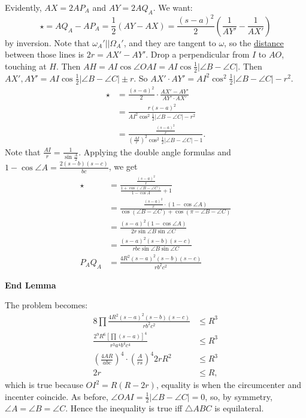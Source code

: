 \begin{enumerate}
 Evidently, $AX=2AP_{A}$ and $AY=2AQ_{A}$. We want:
 \[\star=AQ_{A}-AP_{A}=\frac{1}{2}(AY-AX)=\frac{(s-a)^{2}}{2}\left(\frac{1}{AY'}-\frac{1}{AX'}\right)\]by inversion. Note that $\omega_{A}' || \Omega_{A}'$, and they are tangent to $\omega$, so the \href{https://artofproblemsolving.com/wiki/index.php?title=Distance}{distance} between those lines is $2r=AX'-AY'$. Drop a perpendicular from $I$ to $AO$, touching at $H$. Then $AH=AI\cos\angle OAI=AI\cos\frac{1}{2}|\angle B-\angle C|$. Then $AX', AY' = AI\cos\frac{1}{2}|\angle B-\angle C|\pm r$. So $AX'\cdot AY' = AI^{2}\cos^{2}\frac{1}{2}|\angle B-\angle C|-r^{2}$.
 \begin{align*} \star &= \frac{(s-a)^{2}}{2}\cdot\frac{AX' - AY'}{AY'\cdot AX'} \\ &= \frac{r(s-a)^{2}}{AI^{2}\cos^{2}\frac{1}{2}|\angle B-\angle C|-r^{2}} \\ &= \frac{\frac{(s-a)^{2}}{r}}{\left(\frac{AI}{r}\right)^{2}\cos^{2}\frac{1}{2}|\angle B-\angle C|-1}. \end{align*}
Note that $\frac{AI}{r} = \frac{1}{\sin\frac{A}{2}}$. Applying the double angle formulas and $1-\cos\angle A=\frac{2(s-b)(s-c)}{bc}$, we get
 \begin{align*} \star &= \frac{\frac{(s-a)^{2}}{r}}{\frac{1+\cos (\angle B-\angle C)}{1-\cos A}+1} \\ &= \frac{\frac{(s-a)^{2}}{r}\cdot (1-\cos \angle A)}{\cos(\angle B-\angle C)+\cos(\pi-\angle B-\angle C)} \\ &= \frac{(s-a)^{2}(1-\cos \angle A)}{2r\sin \angle B\sin \angle C} \\ &= \frac{(s-a)^{2}(s-b)(s-c)}{rbc\sin\angle B\sin\angle C} \\ P_{A}Q_{A} &= \frac{4R^{2}(s-a)^{2}(s-b)(s-c)}{rb^{2}c^{2}} \end{align*}


 \textbf{End Lemma}

 The problem becomes:
 \begin{align*} 8\prod \frac{ 4R^{2}(s-a)^{2}(s-b)(s-c)}{rb^{2}c^{2}} &\leq R^{3} \\ \frac{2^{9}R^{6}\left[\prod(s-a)\right]^{4}}{r^{3}a^{4}b^{4}c^{4}} &\leq R^{3} \\ \left(\frac{4AR}{abc}\right)^{4}\cdot\left(\frac{A}{rs}\right)^{4}2rR^{2} &\leq R^{3} \\ 2r &\leq R, \end{align*}
which is true because $OI^{2}=R(R-2r)$, equality is when the circumcenter and incenter coincide. As before, $\angle OAI=\frac{1}{2}|\angle B-\angle C|=0$, so, by symmetry, $\angle A=\angle B=\angle C$. Hence the inequality is true iff $\triangle ABC$ is equilateral.


\end{enumerate}
